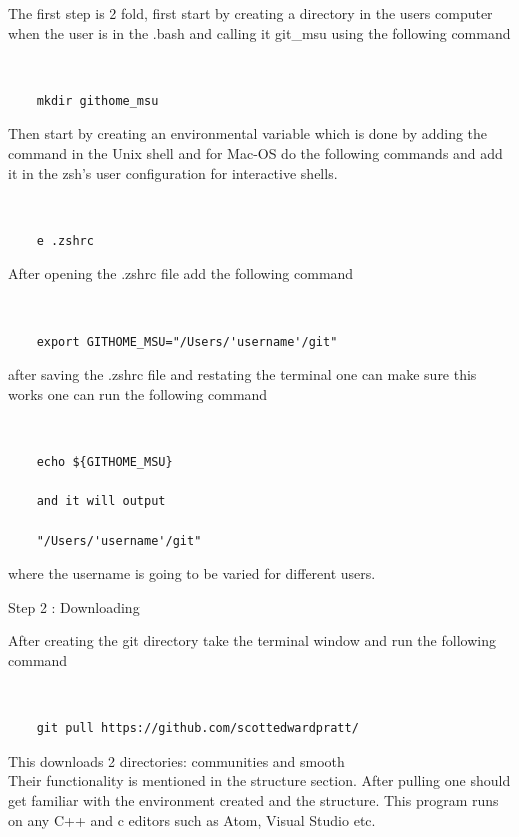 \documentclass[12pt]{article}
\numberwithin{equation}{section}
\numberwithin{figure}{section}
\begin{document}
The first step is 2 fold, first start by creating a directory in the users computer when the user is in the .bash and calling it git\_msu using the following command 

{\tt 
\begin{verbatim}
    mkdir githome_msu 
\end{verbatim}
}

Then start by creating an environmental variable which is done by adding the command in the Unix shell and for Mac-OS do the following commands and add it in the zsh's user configuration for interactive shells.  

{\tt 
\begin{verbatim}
    e .zshrc
\end{verbatim}
}

After opening the .zshrc file add the following command 

{\tt 
\begin{verbatim}
    export GITHOME_MSU="/Users/'username'/git"
\end{verbatim}
}

after saving the .zshrc file and restating the terminal one can make sure this works one can run the following command 

{\tt 
\begin{verbatim}
    echo ${GITHOME_MSU} 
    
    and it will output 
    
    "/Users/'username'/git"
\end{verbatim}
}

where the username is going to be varied for different users.

\begin{description}
\item[Step 2 : Downloading] 
\end{description}

After creating the git directory take the terminal window and run the following command 

{\tt 
\begin{verbatim}
    git pull https://github.com/scottedwardpratt/ 
\end{verbatim}
}

This downloads 2 directories: communities and smooth \\

Their functionality is mentioned in the structure section. 
After pulling one should get familiar with the environment created and the structure. This program runs on any C++ and c editors such as Atom, Visual Studio etc. \\ 
\end{document}
